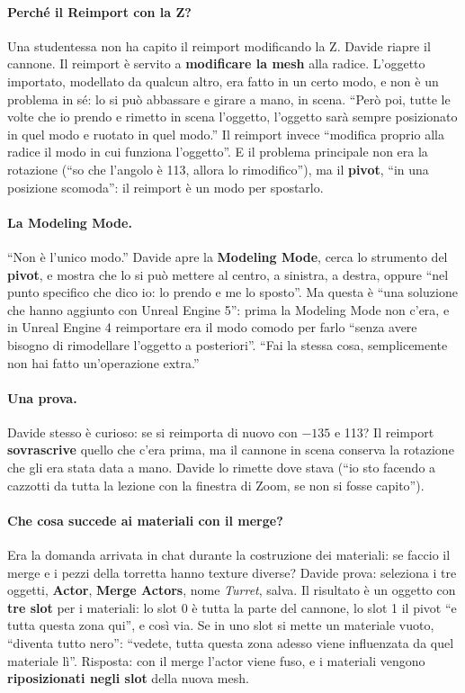 \paragraph{Perché il Reimport con la Z?} Una studentessa non ha capito il reimport
modificando la Z. Davide riapre il cannone. Il reimport è servito a \textbf{modificare la
mesh} alla radice. L'oggetto importato, modellato da qualcun altro, era fatto in un
certo modo, e non è un problema in sé: lo si può abbassare e girare a mano, in scena.
``Però poi, tutte le volte che io prendo e rimetto in scena l'oggetto, l'oggetto sarà
sempre posizionato in quel modo e ruotato in quel modo.'' Il reimport invece ``modifica
proprio alla radice il modo in cui funziona l'oggetto''. E il problema principale non
era la rotazione (``so che l'angolo è 113, allora lo rimodifico''), ma il
\textbf{pivot}, ``in una posizione scomoda'': il reimport è un modo per spostarlo.

\paragraph{La Modeling Mode.} ``Non è l'unico modo.'' Davide apre la \textbf{Modeling
Mode}, cerca lo strumento del \textbf{pivot}, e mostra che lo si può mettere al centro,
a sinistra, a destra, oppure ``nel punto specifico che dico io: lo prendo e me lo
sposto''. Ma questa è ``una soluzione che hanno aggiunto con Unreal Engine 5'': prima la
Modeling Mode non c'era, e in Unreal Engine 4 reimportare era il modo comodo per farlo
``senza avere bisogno di rimodellare l'oggetto a posteriori''. ``Fai la stessa cosa,
semplicemente non hai fatto un'operazione extra.''

\paragraph{Una prova.} Davide stesso è curioso: se si reimporta di nuovo con $-135$ e
113? Il reimport \textbf{sovrascrive} quello che c'era prima, ma il cannone in scena
conserva la rotazione che gli era stata data a mano. Davide lo rimette dove stava (``io
sto facendo a cazzotti da tutta la lezione con la finestra di Zoom, se non si fosse
capito'').

\paragraph{Che cosa succede ai materiali con il merge?} Era la domanda arrivata in chat
durante la costruzione dei materiali: se faccio il merge e i pezzi della torretta hanno
texture diverse? Davide prova: seleziona i tre oggetti, \textbf{Actor}, \textbf{Merge
Actors}, nome \emph{Turret}, salva. Il risultato è un oggetto con \textbf{tre slot} per i
materiali: lo slot 0 è tutta la parte del cannone, lo slot 1 il pivot ``e tutta questa
zona qui'', e così via. Se in uno slot si mette un materiale vuoto, ``diventa tutto
nero'': ``vedete, tutta questa zona adesso viene influenzata da quel materiale lì''.
Risposta: con il merge l'actor viene fuso, e i materiali vengono \textbf{riposizionati
negli slot} della nuova mesh.

